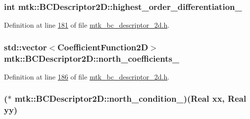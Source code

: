 \hypertarget{classmtk_1_1BCDescriptor2D_af6dad4b8fe09597f25a710b1aec40a48}{
\subsubsection[{highest\+\_\+order\+\_\+differentiation\+\_\+}]{\setlength{\rightskip}{0pt plus 5cm}int mtk\+::\+B\+C\+Descriptor2\+D\+::highest\+\_\+order\+\_\+differentiation\+\_\+\hspace{0.3cm}{\ttfamily [private]}}}\label{classmtk_1_1BCDescriptor2D_af6dad4b8fe09597f25a710b1aec40a48}


Definition at line \hyperlink{mtk__bc__descriptor__2d_8h_source_l00181}{181} of file \hyperlink{mtk__bc__descriptor__2d_8h_source}{mtk\+\_\+bc\+\_\+descriptor\+\_\+2d.\+h}.

\hypertarget{classmtk_1_1BCDescriptor2D_a5429c040c034303dd92dcff554f9efad}{
\subsubsection[{north\+\_\+coefficients\+\_\+}]{\setlength{\rightskip}{0pt plus 5cm}std\+::vector$<${\bf Coefficient\+Function2\+D}$>$ mtk\+::\+B\+C\+Descriptor2\+D\+::north\+\_\+coefficients\+\_\+\hspace{0.3cm}{\ttfamily [private]}}}\label{classmtk_1_1BCDescriptor2D_a5429c040c034303dd92dcff554f9efad}


Definition at line \hyperlink{mtk__bc__descriptor__2d_8h_source_l00186}{186} of file \hyperlink{mtk__bc__descriptor__2d_8h_source}{mtk\+\_\+bc\+\_\+descriptor\+\_\+2d.\+h}.

\hypertarget{classmtk_1_1BCDescriptor2D_af3ecae6fedd3f3422e62b247ef5fea42}{
\subsubsection[{north\+\_\+condition\+\_\+}]{($\ast$ mtk\+::\+B\+C\+Descriptor2\+D\+::north\+\_\+condition\+\_\+)({\bf Real} xx, {\bf Real} yy)\hspace{0.3cm}{\ttfamily [private]}}}\label{classmtk_1_1BCDescriptor2D_af3ecae6fedd3f3422e62b247ef5fea42}


